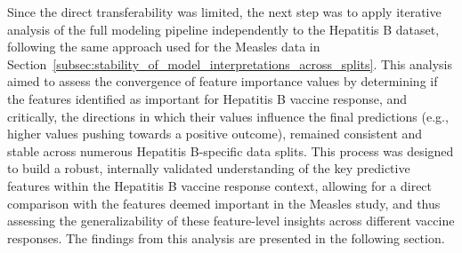 \documentclass[12pt,a4paper]{report}
\begin{document}
\noindent
Since the direct transferability was limited, the next step was to apply iterative analysis of the full modeling pipeline independently to the Hepatitis B dataset, following the same approach used for the Measles data in Section~\ref{subsec:stability_of_model_interpretations_across_splits}. This analysis aimed to assess the convergence of feature importance values by determining if the features identified as important for Hepatitis B vaccine response, and critically, the directions in which their values influence the final predictions (e.g., higher values pushing towards a positive outcome), remained consistent and stable across numerous Hepatitis B-specific data splits. This process was designed to build a robust, internally validated understanding of the key predictive features within the Hepatitis B vaccine response context, allowing for a direct comparison with the features deemed important in the Measles study, and thus assessing the generalizability of these feature-level insights across different vaccine responses. The findings from this analysis are presented in the following section.

\pagebreak
\end{document}
